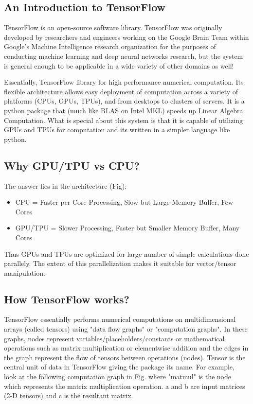 \documentclass[10pt,letterpaper]{article}
\begin{document}
\subsection*{An Introduction to TensorFlow}

TensorFlow is an open-source software library. TensorFlow was originally developed by researchers and engineers working on the Google Brain Team within Google’s Machine Intelligence research organization for the purposes of conducting machine learning and deep neural networks research, but the system is general enough to be applicable in a wide variety of other domains as well!

Essentially, TensorFlow library for high performance numerical computation. Its flexible architecture allows easy deployment of computation across a variety of platforms (CPUs, GPUs, TPUs), and from desktops to clusters of servers. It is a python package that (much like BLAS on Intel MKL) speeds up Linear Algebra Computation. What is special about this system is that it is capable of utilizing GPUs and TPUs for computation and its written in a simpler language like python.

\subsection*{Why GPU/TPU vs CPU?}

The answer lies in the architecture (Fig):  
\begin{itemize}
\item CPU = Faster per Core Processing, Slow but Large Memory Buffer, Few Cores
\item GPU/TPU = Slower Processing, Faster but Smaller Memory Buffer, Many Cores
\end{itemize}

Thus GPUs and TPUs are optimized for large number of simple calculations done parallely. The extent of this  parallelization makes it suitable for vector/tensor manipulation.

\subsection*{How TensorFlow works?}

TensorFlow essentially performs numerical computations on multidimensional arrays (called tensors) using "data flow graphs" or "computation graphs". In these graphs, nodes represent variables/placeholders/constants or mathematical operations such as matrix multiplication or elementwise addition and the edges in the graph represent the flow of tensors between operations (nodes). Tensor is the central unit of data in TensorFlow giving the package its name. For example, look at the following computation graph in Fig. where "matmul" is the node which represents the matrix multiplication operation. a and b are input matrices (2-D tensors) and c is the resultant matrix.
\end{document}
